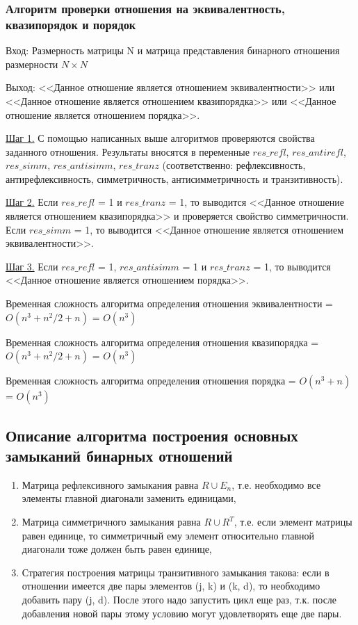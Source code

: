 \documentclass[bachelor, och, labwork]{shiza}
\begin{document}
	\subsubsection{Алгоритм проверки отношения на эквивалентность, квазипорядок и порядок}
	

	$\textit{Вход:}$ Размерность матрицы N и матрица представления бинарного отношения размерности $N \times N$
	
	$\textit{Выход:}$ <<Данное отношение является отношением эквивалентности>> или <<Данное отношение является отношением квазипорядка>> или <<Данное отношение является отношением порядка>>.
	
	\underline{Шаг 1.} С помощью написанных выше алгоритмов проверяются свойства заданного отношения. Результаты вносятся в переменные $res\_refl$, $res\_antirefl$, $res\_simm$, $res\_antisimm$, $res\_tranz$ (соответственно: рефлексивность, антирефлексивность, симметричность, антисимметричность и транзитивность).
	
	\underline{Шаг 2.} Если  $res\_refl$ = 1 и $res\_tranz$ = 1, то выводится <<Данное отношение является отношением квазипорядка>> и проверяется свойство симметричности. Если $res\_simm$ = 1, то выводится <<Данное отношение является отношением эквивалентности>>.
	
	\underline{Шаг 3.} Если $res\_refl$ = 1, $res\_antisimm$ = 1 и $res\_tranz$ = 1, то выводится <<Данное отношение является отношением порядка>>.
	
	
	Временная сложность алгоритма определения отношения эквивалентности = $O(n^3 + n^2/2 + n)$ = $O(n^3)$
	
	Временная сложность алгоритма определения отношения квазипорядка = $O(n^3 + n^2/2 + n)$ = $O(n^3)$
	
	Временная сложность алгоритма определения отношения порядка = $O(n^3 + n)$ = $O(n^3)$
	
	
	\subsection{Описание алгоритма построения основных замыканий бинарных отношений}
	
	\begin{enumerate}
		\item Матрица $\textit{рефлексивного}$ замыкания равна $R \cup E_n$, т.е. необходимо все элементы главной диагонали заменить единицами,
		\item Матрица $\textit{симметричного}$ замыкания равна $R \cup R^T$, т.е. если элемент матрицы равен единице, то симметричный ему элемент относительно главной диагонали тоже должен быть равен единице,
		\item Стратегия построения матрицы $\textit{транзитивного}$ замыкания такова: если в отношении имеется две пары элементов (j, k) и (k, d), то необходимо добавить пару (j, d). После этого надо запустить цикл еще раз, т.к. после добавления новой пары этому условию могут удовлетворять еще две пары. 
	\end{enumerate}
\end{document}

